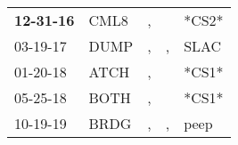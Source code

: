 \begin{supertabular}{p{0.07\textwidth}p{0.06\textwidth}p{0.02\textwidth}p{0.02\textwidth}p{0.06\textwidth}}
 \textbf{12-31-16\textsuperscript{}} &  CML8\textsuperscript{} &  , &    &                   *CS2* \\
          03-19-17\textsuperscript{} &  DUMP\textsuperscript{} &  , &  , &  SLAC\textsuperscript{} \\
          01-20-18\textsuperscript{} &  ATCH\textsuperscript{} &  , &    &                   *CS1* \\
          05-25-18\textsuperscript{} &  BOTH\textsuperscript{} &  , &    &                   *CS1* \\
          10-19-19\textsuperscript{} &  BRDG\textsuperscript{} &  , &  , &  peep\textsuperscript{} \\
\end{supertabular}
